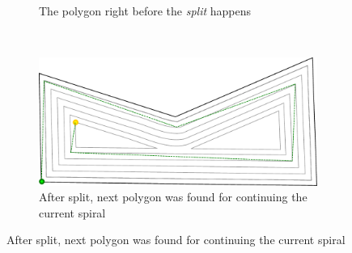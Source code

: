 \documentclass[10pt,twoside,a4paper]{report}
\begin{document}
\begin{figure}[htbp]
\begin{subfigure}[b]{0.45\textwidth}
    		\caption{The polygon right before the \textit{split} happens}
    \end{subfigure}~
    \begin{subfigure}[b]{0.45\textwidth}
    		\includegraphics[width=\textwidth]{images/algorithms/spiral_fill/done.pdf}
    		\caption{After split, next polygon was found for continuing the current spiral}


\end{subfigure}
\end{figure}
\end{document}
